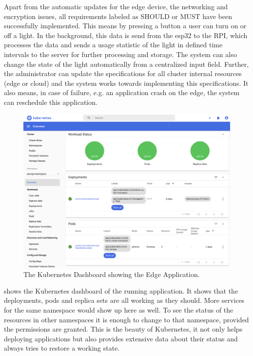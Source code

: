 Apart from the automatic updates for the edge device, the networking and encryption issues, all requirements labeled as SHOULD or MUST have been successfully implemented. This means by pressing a button a user can turn on or off a light. In the background, this data is send from the esp32 to the RPI, which processes the data and sends a usage statistic of the light in defined time intervals to the server for further processing and storage. The system can also change the state of the light automatically from a centralized input field. Further, the administrator can update the specifications for all cluster internal resources (edge or cloud) and the system works towards implementing this specifications. It also means, in case of failure, e.g. an application crash on the edge, the system can reschedule this application. 

\begin{figure}[h]
    \centering
    \includegraphics[width=\textwidth]{figures/dashboardK8s.png}
    \caption{The Kubernetes Dashboard showing the Edge Application.}
    \label{fig:dashboarK8s}
\end{figure}

 shows the Kubernetes dashboard of the running application. It shows that the deployments, pods and replica sets are all working as they should. More services for the same namespace would show up here as well. To see the status of the resources in other namespaces it is enough to change to that namespace, provided the permissions are granted. This is the beauty of Kubernetes, it not only helps deploying applications but also provides extensive data about their status and always tries to restore a working state.

